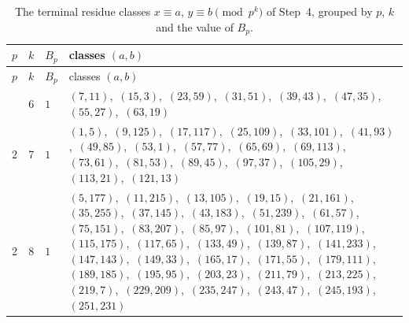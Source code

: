 \documentclass[11pt]{article}
\begin{document}
\begingroup\small
\setlength{\LTcapwidth}{\textwidth}
\begin{longtable}{@{}rrl>{\raggedright\arraybackslash}p{}@{}}
\caption{The terminal residue classes $x\equiv a$, $y\equiv b\pmod{p^k}$ of Step~4, grouped by $p$, $k$ and the value of $B_p$.}\label{tab:local}\\
\hline $p$ & $k$ & $B_p$ & classes $(a,b)$\\\hline\endfirsthead
\hline $p$ & $k$ & $B_p$ & classes $(a,b)$\\\hline\endhead\hline\endfoot
2 & 6 & $1$ & $(7,11)$,\allowbreak\ $(15,3)$,\allowbreak\ $(23,59)$,\allowbreak\ $(31,51)$,\allowbreak\ $(39,43)$,\allowbreak\ $(47,35)$,\allowbreak\ $(55,27)$,\allowbreak\ $(63,19)$\\
2 & 7 & $1$ & $(1,5)$,\allowbreak\ $(9,125)$,\allowbreak\ $(17,117)$,\allowbreak\ $(25,109)$,\allowbreak\ $(33,101)$,\allowbreak\ $(41,93)$,\allowbreak\ $(49,85)$,\allowbreak\ $(53,1)$,\allowbreak\ $(57,77)$,\allowbreak\ $(65,69)$,\allowbreak\ $(69,113)$,\allowbreak\ $(73,61)$,\allowbreak\ $(81,53)$,\allowbreak\ $(89,45)$,\allowbreak\ $(97,37)$,\allowbreak\ $(105,29)$,\allowbreak\ $(113,21)$,\allowbreak\ $(121,13)$\\
2 & 8 & $1$ & $(5,177)$,\allowbreak\ $(11,215)$,\allowbreak\ $(13,105)$,\allowbreak\ $(19,15)$,\allowbreak\ $(21,161)$,\allowbreak\ $(35,255)$,\allowbreak\ $(37,145)$,\allowbreak\ $(43,183)$,\allowbreak\ $(51,239)$,\allowbreak\ $(61,57)$,\allowbreak\ $(75,151)$,\allowbreak\ $(83,207)$,\allowbreak\ $(85,97)$,\allowbreak\ $(101,81)$,\allowbreak\ $(107,119)$,\allowbreak\ $(115,175)$,\allowbreak\ $(117,65)$,\allowbreak\ $(133,49)$,\allowbreak\ $(139,87)$,\allowbreak\ $(141,233)$,\allowbreak\ $(147,143)$,\allowbreak\ $(149,33)$,\allowbreak\ $(165,17)$,\allowbreak\ $(171,55)$,\allowbreak\ $(179,111)$,\allowbreak\ $(189,185)$,\allowbreak\ $(195,95)$,\allowbreak\ $(203,23)$,\allowbreak\ $(211,79)$,\allowbreak\ $(213,225)$,\allowbreak\ $(219,7)$,\allowbreak\ $(229,209)$,\allowbreak\ $(235,247)$,\allowbreak\ $(243,47)$,\allowbreak\ $(245,193)$,\allowbreak\ $(251,231)$\\

\end{longtable}
\end{document}
